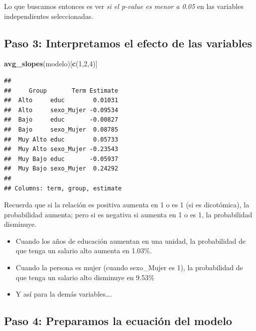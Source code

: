 \documentclass[
]{article}
\newenvironment{Shaded}{\begin{snugshade}}{\end{snugshade}}
\newcommand{\DecValTok}[1]{\textcolor[rgb]{0.00,0.00,0.81}{#1}}
\newcommand{\FunctionTok}[1]{\textcolor[rgb]{0.13,0.29,0.53}{\textbf{#1}}}
\newcommand{\NormalTok}[1]{#1}
\begin{document}
Lo que buscamos entonces es ver \emph{si el p-value es menor a 0.05} en
las variables independientes seleccionadas.

\hypertarget{paso-3-interpretamos-el-efecto-de-las-variables}{%
\subsection{\texorpdfstring{\textbf{Paso 3: Interpretamos el efecto de
las
variables}}{Paso 3: Interpretamos el efecto de las variables}}\label{paso-3-interpretamos-el-efecto-de-las-variables}}

\begin{Shaded}
\begin{Highlighting}[]
\FunctionTok{avg\_slopes}\NormalTok{(modelo)[}\FunctionTok{c}\NormalTok{(}\DecValTok{1}\NormalTok{,}\DecValTok{2}\NormalTok{,}\DecValTok{4}\NormalTok{)] }
\end{Highlighting}
\end{Shaded}

\begin{verbatim}
## 
##     Group       Term Estimate
##  Alto     educ        0.01031
##  Alto     sexo_Mujer -0.09534
##  Bajo     educ       -0.00827
##  Bajo     sexo_Mujer  0.08785
##  Muy Alto educ        0.05733
##  Muy Alto sexo_Mujer -0.23543
##  Muy Bajo educ       -0.05937
##  Muy Bajo sexo_Mujer  0.24292
## 
## Columns: term, group, estimate
\end{verbatim}

Recuerda que si la relación es positiva aumenta en 1 o es 1 (si es
dicotómica), la probabilidad aumenta; pero si es negativa si aumenta en
1 o es 1, la probabilidad disminuye.

\begin{itemize}
\item
  Cuando los años de educación aumentan en una unidad, la probabilidad
  de que tenga un salario alto aumenta en 1.03\%.~
\item
  Cuando la persona es mujer (cuando sexo\_Mujer es 1), la probabilidad
  de que tenga un salario alto disminuye en 9.53\%
\item
  Y así para la demás variables\ldots.
\end{itemize}

\hypertarget{paso-4-preparamos-la-ecuaciuxf3n-del-modelo}{%
\subsection{\texorpdfstring{\textbf{Paso 4: Preparamos la ecuación del
modelo}}{Paso 4: Preparamos la ecuación del modelo}}\label{paso-4-preparamos-la-ecuaciuxf3n-del-modelo}}
\end{document}

